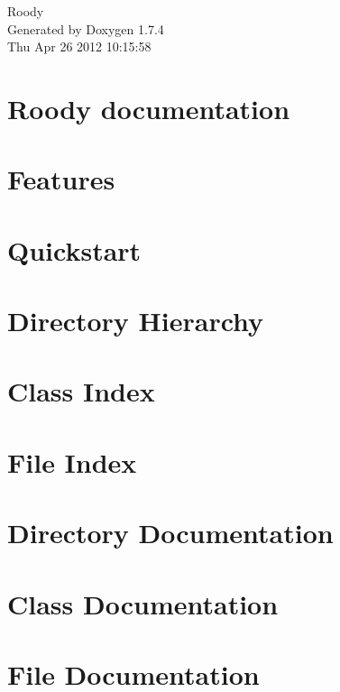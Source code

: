 \documentclass[letterpaper]{book}
\begin{document}
\begin{titlepage}
\vspace*{7cm}
\begin{center}
{\Large Roody }\\
\vspace*{1cm}
{\large Generated by Doxygen 1.7.4}\\
\vspace*{0.5cm}
{\small Thu Apr 26 2012 10:15:58}\\
\end{center}
\end{titlepage}
\clearemptydoublepage
{}
\tableofcontents
\clearemptydoublepage
{}
\chapter{Roody documentation}
\label{index}
\chapter{Features}
\label{features}

\chapter{Quickstart}
\label{quickstart}

\chapter{Directory Hierarchy}

\chapter{Class Index}

\chapter{File Index}

\chapter{Directory Documentation}


\chapter{Class Documentation}









\chapter{File Documentation}












\printindex
\end{document}
